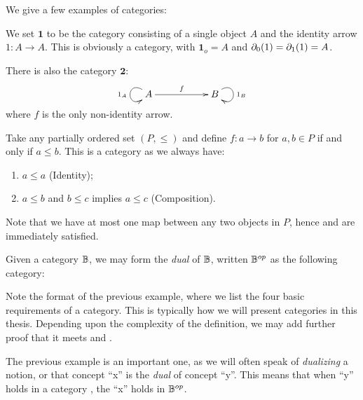 We give a few examples of categories:

\begin{example}\label{ex:small_finite_categories}
  We set $\mathbf{1}$ to be the category consisting of a single object $A$ and the identity arrow
  $1:A\to A$. This  is obviously a category, with $\mathbf{1}_o = A$ and
  $\partial_0({1}) = \partial_1({1}) = A$.

  There is also the category $\mathbf{2}$:
  \[
    \xymatrix{
      A\ar[rr]^{f} \ar@(ul,dl)[]_{1_A}& & B  \ar@(ur,dr)[]^{1_B}
    }
  \]
  where $f$ is the only non-identity arrow.
\end{example}

\begin{example}\label{ex:preorders-are-categories}
  Take any partially ordered set $(P,\le)$ and define $f:a \to b$ for $a,b\in P$ if and only if
  $a\le b$. This is a category as we always have:
  \begin{enumerate}[{(}i{)}]
  \item $a \le a$ (Identity);
  \item $a \le b$ and $b \le c$ implies $a\le c$ (Composition).
  \end{enumerate}
  Note that we have at most one map between any two objects in $P$, hence \catone and \cattwo are
  immediately satisfied.
\end{example}
\begin{example}\label{ex:dual_category}
Given a category $\mathbb{B}$, we may form the \emph{dual} of $\mathbb{B}$, written $\mathbb{B}^{op}$ as the following
category:
\end{example}

Note the format of the previous example, where we list the four basic requirements of a
category. This is typically how we will present categories in this thesis. Depending upon the
complexity of the definition, we may add further proof that it meets \catone and \cattwo.

The previous example is an important one, as we will often speak of \emph{dualizing} a notion, or
that concept ``x'' is the \emph{dual} of concept ``y''. This means that when ``y'' holds in a
category \B, the ``x'' holds in $\mathbb{B}^{op}$.

